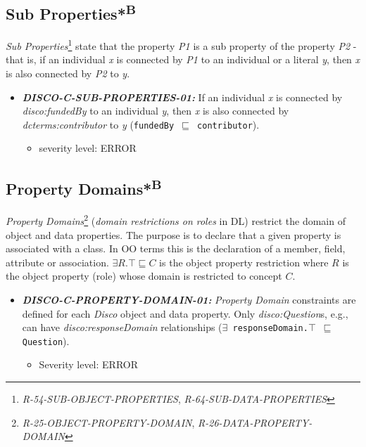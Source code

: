 \documentclass{llncs}
\newcommand{\ms}[1]{\texttt{#1}}
\begin{document}
\subsection{Sub Properties*\textsuperscript{B}}

{\em Sub Properties}\footnote{\emph{R-54-SUB-OBJECT-PROPERTIES}, \emph{R-64-SUB-DATA-PROPERTIES}} state that the property \emph{P1} is a sub property of the property \emph{P2} - that is, if an individual \emph{x} is connected by \emph{P1} to an individual or a literal \emph{y}, then \emph{x} is also connected by \emph{P2} to \emph{y}. 

\begin{itemize}
	\item \textbf{{\em DISCO-C-SUB-PROPERTIES-01:}}
If an individual \emph{x} is connected by {\em disco:fundedBy} to an individual \emph{y}, then \emph{x} is also connected by {\em dcterms:contributor} to \emph{y} (\ms{fundedBy $\sqsubseteq$ contributor}). 
	\begin{itemize}
		\item severity level: ERROR
	\end{itemize}
\end{itemize}

\subsection{Property Domains*\textsuperscript{B}}

{\em Property Domains}\footnote{{\em R-25-OBJECT-PROPERTY-DOMAIN}, {\em R-26-DATA-PROPERTY-DOMAIN}} ({\em domain restrictions on roles} in DL) restrict the domain of object and data properties.
The purpose is to declare that a given property is associated with a class. 
In OO terms this is the declaration of a member, field, attribute or association. 
$\exists R. \top \sqsubseteq C$ is the object property restriction where $R$ is the object property (role) whose domain is restricted to concept $C$.

\begin{itemize}
	\item \textbf{{\em DISCO-C-PROPERTY-DOMAIN-01:}} 
	{\em Property Domain} constraints are defined for each \emph{Disco} object and data property.
  Only {\em disco:Question}s, e.g., can have {\em disco:responseDomain} relationships (\ms{$\exists$ responseDomain.$\top$ $\sqsubseteq$ Question}).
	\begin{itemize}
		\item Severity level: ERROR
	\end{itemize}
\end{itemize}
\end{document}
